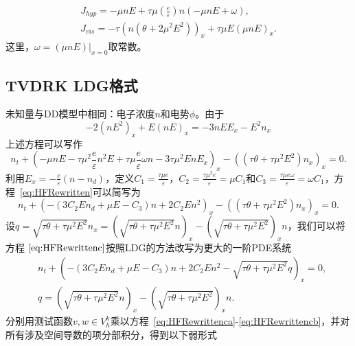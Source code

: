 $$
	\begin{gathered}
		J_{h y p}=-\mu n E+\tau \mu\left(\frac{e}{\varepsilon}\right) n(-\mu n E+\omega), \\
		J_{v i s}=-\tau\left(n\left(\theta+2 \mu^{2} E^{2}\right)\right)_{x}+\tau \mu E(\mu n E)_{x} .
	\end{gathered}
$$
这里，$\omega=\left.(\mu n E)\right|_{x=0}$取常数。
\subsection{TVDRK LDG格式}
未知量与DD模型中相同：电子浓度$n$和电势$\phi$。由于
$$
	-2\left(n E^{2}\right)_{x}+E(n E)_{x}=-3 n E E_{x}-E^{2} n_{x}
$$
上述方程可以写作
\begin{equation}
	n_{t}+\left(-\mu n E-\tau \mu^{2} \frac{e}{\varepsilon} n^{2} E+\tau \mu \frac{e}{\varepsilon} \omega n-3 \tau \mu^{2} E n E_{x}\right)_{x}-\left(\left(\tau \theta+\tau \mu^{2} E^{2}\right) n_{x}\right)_{x}=0.\label{eq:HFRewritten}
\end{equation}
利用$E_{x}=-\frac{e}{\varepsilon}\left(n-n_{d}\right)$，定义$C_{1}=\frac{\tau \mu e}{\varepsilon}$，$C_{2}=\frac{\tau \mu^{2} e}{\varepsilon}=\mu C_{1}$和$C_{3}=\frac{\tau \mu e \omega}{\varepsilon}=\omega C_{1}$，方程~\eqref{eq:HFRewritten}可以简写为
\begin{equation}
	n_{t}+\left(-\left(3 C_{2} E n_{d}+\mu E-C_{3}\right) n+2 C_{2} E n^{2}\right)_{x}-\left(\left(\tau \theta+\tau \mu^{2} E^{2}\right) n_{x}\right)_{x}=0 .  \label{eq:HFRewrittenc}
\end{equation}
设$q=\sqrt{\tau \theta+\tau \mu^{2} E^{2}} n_{x}=\left(\sqrt{\tau \theta+\tau \mu^{2} E^{2}} n\right)_{x}-\left(\sqrt{\tau \theta+\tau \mu^{2} E^{2}}\right)_{x} n$，我们可以将方程$~\eqref{eq:HFRewrittenc}$按照LDG的方法改写为更大的一阶PDE系统
\begin{align}
	 & n_{t}+\left(-\left(3 C_{2} E n_{d}+\mu E-C_{3}\right) n+2 C_{2} E n^{2}-\sqrt{\tau \theta+\tau \mu^{2} E^{2}} q\right)_{x}=0, \label{eq:HFRewrittenca} \\
	 & q=\left(\sqrt{\tau \theta+\tau \mu^{2} E^{2}} n\right)_{x}-\left(\sqrt{\tau \theta+\tau \mu^{2} E^{2}}\right)_{x} n.\label{eq:HFRewrittencb}
\end{align}
分别用测试函数$v, w \in V_{h}^{k}$乘以方程~\eqref{eq:HFRewrittenca}-\eqref{eq:HFRewrittencb}，并对所有涉及空间导数的项分部积分，得到以下弱形式
